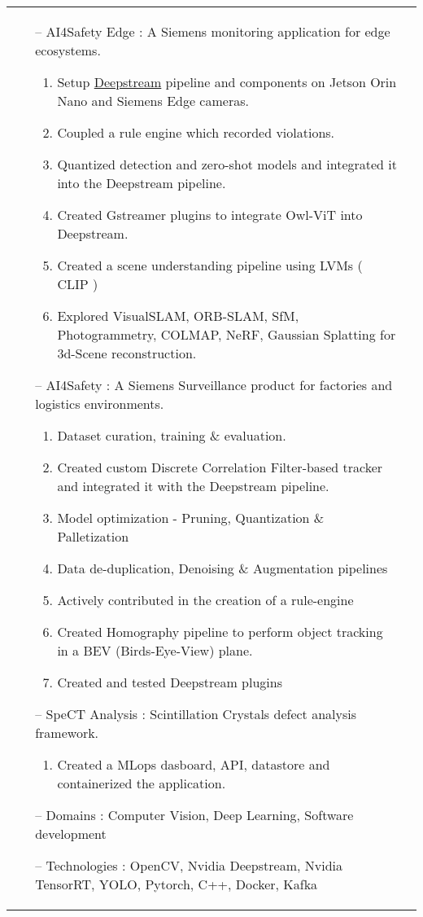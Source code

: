 \documentclass[a4paper, 11pt]{article}
\begin{document}
\begin{tabularx}{\linewidth}{ @{}l r@{} }
{\begin{minipage}[t]{\linewidth}
\begin{itemize}[nosep,after=\strut, leftmargin=1em, itemsep=3pt]
\begin{enumerate}
                    \end{enumerate}
					\item[--] AI4Safety Edge : A Siemens monitoring application for edge ecosystems.
					\begin{enumerate}
						\item Setup \href{https://developer.nvidia.com/deepstream-sdk}{Deepstream} pipeline and components on Jetson Orin Nano and Siemens Edge cameras.
						\item Coupled a rule engine which recorded violations.
						\item Quantized detection and zero-shot models and integrated it into the Deepstream pipeline.
						\item Created Gstreamer plugins to integrate Owl-ViT into Deepstream.
						\item Created a scene understanding pipeline using LVMs ( CLIP )
                        \item Explored VisualSLAM, ORB-SLAM, SfM, Photogrammetry, COLMAP, NeRF, Gaussian Splatting for 3d-Scene reconstruction.  
					\end{enumerate}
					\item[--] AI4Safety : A Siemens Surveillance product for factories and logistics environments.
					\begin{enumerate}
						\item Dataset curation, training \& evaluation.
                        \item Created custom Discrete Correlation Filter-based tracker and integrated it with the Deepstream pipeline.
						\item Model optimization - Pruning, Quantization \& Palletization
						\item Data de-duplication, Denoising \& Augmentation pipelines
						\item Actively contributed in the creation of a rule-engine
                        \item Created Homography pipeline to perform object tracking in a BEV (Birds-Eye-View) plane.
						\item Created and tested Deepstream plugins
					\end{enumerate}
					\item [--] SpeCT Analysis : Scintillation Crystals defect analysis framework. 
					\begin{enumerate}
						\item Created a MLops dasboard, API, datastore and containerized the application. 
					\end{enumerate}
					
					\item[--] Domains : Computer Vision, Deep Learning, Software development
					\item[--] Technologies : OpenCV, Nvidia Deepstream, Nvidia TensorRT, YOLO, Pytorch, C++, Docker, Kafka
				\end{itemize}
			\end{minipage}
		}  
	\end{tabularx}
	
\end{document}
